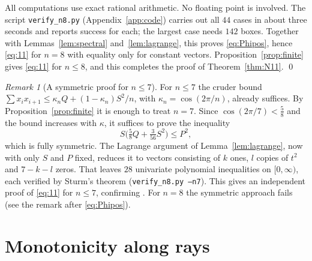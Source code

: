 \documentclass[11pt]{article}
\theoremstyle{remark}
\newtheorem{remark}[theorem]{Remark}
\numberwithin{equation}{section}
\begin{document}
All computations use exact rational arithmetic. No floating point is involved. The script
\texttt{verify\_n8.py} (Appendix~\ref{app:code}) carries out all $44$ cases in about three seconds
and reports success for each; the largest case needs $142$ boxes. Together with
Lemmas~\ref{lem:spectral} and~\ref{lem:lagrange}, this proves \eqref{eq:Phipos}, hence
\eqref{eq:11} for $n=8$ with equality only for constant vectors. Proposition~\ref{prop:finite}
gives \eqref{eq:11} for $n\le8$, and this completes the proof of Theorem~\ref{thm:N11}.
\qed

\begin{remark}[A symmetric proof for $n\le7$]\label{rem:n7}
For $n\le 7$ the cruder bound $\sum x_ix_{i+1}\le\kappa_nQ+(1-\kappa_n)S^2/n$, with
$\kappa_n=\cos(2\pi/n)$, already suffices. By Proposition~\ref{prop:finite} it is enough to treat
$n=7$. Since $\cos(2\pi/7)<\frac58$ and the bound increases with $\kappa$, it suffices to prove
the inequality
\[
S\Big(\tfrac58 Q+\tfrac{3}{56}S^2\Big)\le P^2 ,
\]
which is fully symmetric. The Lagrange argument of Lemma~\ref{lem:lagrange}, now with only $S$ and $P$
fixed, reduces it to vectors consisting of $k$ ones, $l$ copies of $t^2$ and $7-k-l$ zeros. That
leaves $28$ univariate polynomial inequalities on $[0,\infty)$, each verified by Sturm's theorem
(\texttt{verify\_n8.py --n7}). This gives an independent proof of \eqref{eq:11} for $n\le7$,
confirming \cite{Hos}. For $n=8$ the symmetric approach fails (see the remark after
\eqref{eq:Phipos}).
\end{remark}

\section{Monotonicity along rays}\label{sec:rays}
\end{document}
